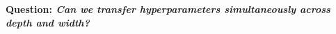 \documentclass{article} %
\newcommand{\lorenzo}[1]{\fTBD{\textcolor{olive}{[Lorenzo] #1}}}
\newcommand{\cp}[1]{\fTBD{{\textcolor{blue}[CP: #1]}}}
\begin{document}
% 
% 
%
% 
% 
% 


\textbf{Question: 
\textit{Can we transfer hyperparameters simultaneously across depth and width?}}
% 
\end{document}
